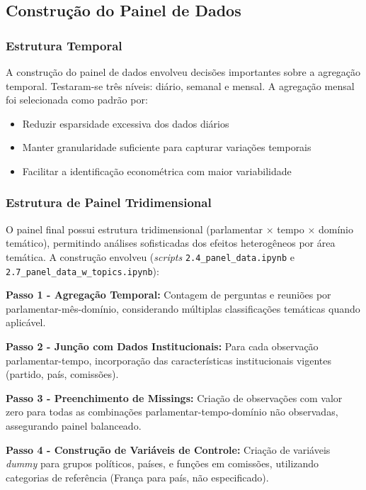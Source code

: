 \subsection{Construção do Painel de Dados}

\subsubsection{Estrutura Temporal}

A construção do painel de dados envolveu decisões importantes sobre a agregação temporal. Testaram-se três níveis: diário, semanal e mensal. A agregação mensal foi selecionada como padrão por:
\begin{itemize}
    \item Reduzir esparsidade excessiva dos dados diários
    \item Manter granularidade suficiente para capturar variações temporais
    \item Facilitar a identificação econométrica com maior variabilidade
\end{itemize}

\subsubsection{Estrutura de Painel Tridimensional}

O painel final possui estrutura tridimensional (parlamentar × tempo × domínio temático), permitindo análises sofisticadas dos efeitos heterogêneos por área temática. A construção envolveu (\textit{scripts} \texttt{2.4\_panel\_data.ipynb} e \texttt{2.7\_panel\_data\_w\_topics.ipynb}):

\textbf{Passo 1 - Agregação Temporal:} Contagem de perguntas e reuniões por parlamentar-mês-domínio, considerando múltiplas classificações temáticas quando aplicável.

\textbf{Passo 2 - Junção com Dados Institucionais:} Para cada observação parlamentar-tempo, incorporação das características institucionais vigentes (partido, país, comissões).

\textbf{Passo 3 - Preenchimento de Missings:} Criação de observações com valor zero para todas as combinações parlamentar-tempo-domínio não observadas, assegurando painel balanceado.

\textbf{Passo 4 - Construção de Variáveis de Controle:} Criação de variáveis \textit{dummy} para grupos políticos, países, e funções em comissões, utilizando categorias de referência (França para país, não especificado).

